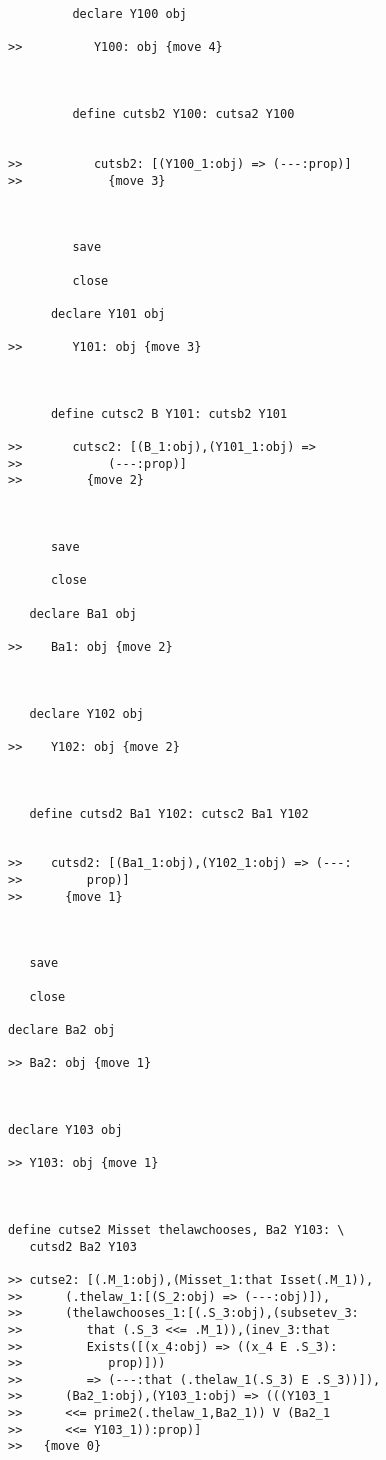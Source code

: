 \documentclass[12pt]{article}
\begin{document}
\begin{verbatim}
         declare Y100 obj

>>          Y100: obj {move 4}



         define cutsb2 Y100: cutsa2 Y100


>>          cutsb2: [(Y100_1:obj) => (---:prop)]
>>            {move 3}



         save

         close

      declare Y101 obj

>>       Y101: obj {move 3}



      define cutsc2 B Y101: cutsb2 Y101

>>       cutsc2: [(B_1:obj),(Y101_1:obj) =>
>>            (---:prop)]
>>         {move 2}



      save

      close

   declare Ba1 obj

>>    Ba1: obj {move 2}



   declare Y102 obj

>>    Y102: obj {move 2}



   define cutsd2 Ba1 Y102: cutsc2 Ba1 Y102


>>    cutsd2: [(Ba1_1:obj),(Y102_1:obj) => (---:
>>         prop)]
>>      {move 1}



   save

   close

declare Ba2 obj

>> Ba2: obj {move 1}



declare Y103 obj

>> Y103: obj {move 1}



define cutse2 Misset thelawchooses, Ba2 Y103: \
   cutsd2 Ba2 Y103

>> cutse2: [(.M_1:obj),(Misset_1:that Isset(.M_1)),
>>      (.thelaw_1:[(S_2:obj) => (---:obj)]),
>>      (thelawchooses_1:[(.S_3:obj),(subsetev_3:
>>         that (.S_3 <<= .M_1)),(inev_3:that
>>         Exists([(x_4:obj) => ((x_4 E .S_3):
>>            prop)]))
>>         => (---:that (.thelaw_1(.S_3) E .S_3))]),
>>      (Ba2_1:obj),(Y103_1:obj) => (((Y103_1
>>      <<= prime2(.thelaw_1,Ba2_1)) V (Ba2_1
>>      <<= Y103_1)):prop)]
>>   {move 0}




\end{verbatim}
\end{document}
